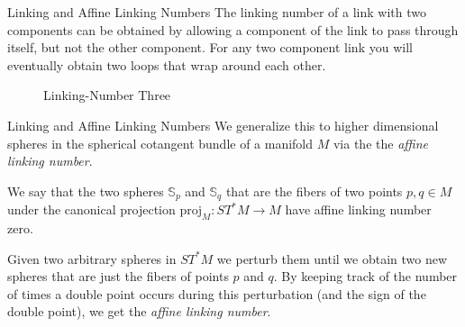 \documentclass{beamer}
\begin{document}
    \begin{frame}{Linking and Affine Linking Numbers}
        The linking number of a link with two components can be obtained by
        allowing a component of the link to pass through itself, but not the
        other component. For any two component link you will eventually obtain
        two loops that wrap around each other.
        \begin{figure}
            \centering
            \caption{Linking-Number Three}
        \end{figure}
    \end{frame}
    \begin{frame}{Linking and Affine Linking Numbers}
        We generalize this to higher dimensional spheres in the spherical
        cotangent bundle of a manifold $M$ via the
        the \textit{affine linking number}.
        \par\hfill\par
        We say that the two spheres $\mathbb{S}_{p}$ and $\mathbb{S}_{q}$ that
        are the fibers of two points $p,q\in{M}$ under the canonical projection
        $\textrm{proj}_{M}:ST^{*}M\rightarrow{M}$ have affine linking number
        zero.
        \par\hfill\par
        Given two arbitrary spheres in $ST^{*}M$ we perturb them until
        we obtain two new spheres that are just the fibers of points $p$ and
        $q$. By keeping track of the number of times a double point occurs
        during this perturbation (and the sign of the double point), we get the
        \textit{affine linking number}.
    \end{frame}
\end{document}
